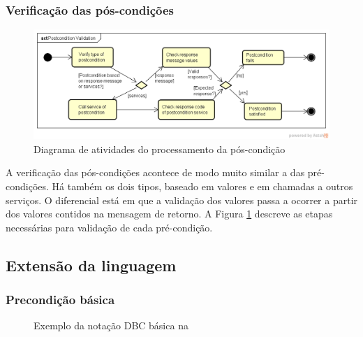 \subsubsection{Verificação das pós-condições}
\vspace{-6mm}

\begin{figure}[!htb]
\centering
\includegraphics[width=\textwidth,trim = 0mm 5mm 0mm
0mm,clip]{PostconditionValidation.png} 
\vspace{-6mm}
\caption{Diagrama de atividades do processamento da pós-condição}
\label{FigServicePostcondition}
\end{figure}

A verificação das pós-condições acontece de modo muito similar a das
pré-condições. Há também os dois tipos, baseado em valores e em chamadas a
outros serviços. O diferencial está em que a validação dos valores passa a
ocorrer a partir dos valores contidos na mensagem de retorno. A Figura
\ref{FigServicePostcondition} descreve as etapas necessárias para validação de
cada pré-condição.

	
	
	
	

\subsection{Extensão da linguagem}

\subsubsection{Precondição básica}

\begin{figure}[htb]
\begin{small}

\end{small}
\caption{Exemplo da notação DBC básica na \neoidl{}}
\label{lst:DBCService}
\end{figure} 

